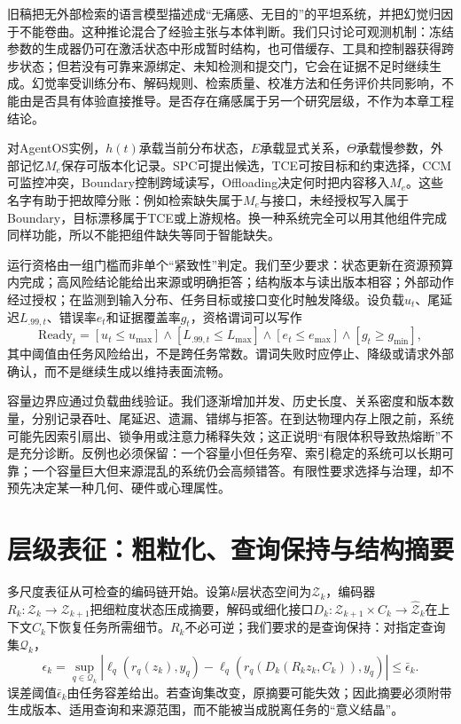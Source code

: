 旧稿把无外部检索的语言模型描述成“无痛感、无目的”的平坦系统，并把幻觉归因于不能卷曲。这种推论混合了经验主张与本体判断。我们只讨论可观测机制：冻结参数的生成器仍可在激活状态中形成暂时结构，也可借缓存、工具和控制器获得跨步状态；但若没有可靠来源绑定、未知检测和提交门，它会在证据不足时继续生成。幻觉率受训练分布、解码规则、检索质量、校准方法和任务评价共同影响，不能由是否具有体验直接推导。是否存在痛感属于另一个研究层级，不作为本章工程结论。

对AgentOS实例，$h(t)$承载当前分布状态，$E$承载显式关系，$\Theta$承载慢参数，外部记忆$M_e$保存可版本化记录。SPC可提出候选，TCE可按目标和约束选择，CCM可监控冲突，Boundary控制跨域读写，Offloading决定何时把内容移入$M_e$。这些名字有助于把故障分账：例如检索缺失属于$M_e$与接口，未经授权写入属于Boundary，目标漂移属于TCE或上游规格。换一种系统完全可以用其他组件完成同样功能，所以不能把组件缺失等同于智能缺失。

运行资格由一组门槛而非单个“紧致性”判定。我们至少要求：状态更新在资源预算内完成；高风险结论能给出来源或明确拒答；结构版本与读出版本相容；外部动作经过授权；在监测到输入分布、任务目标或接口变化时触发降级。设负载$u_t$、尾延迟$L_{.99,t}$、错误率$e_t$和证据覆盖率$g_t$，资格谓词可以写作
\begin{equation}
 \mathrm{Ready}_t=[u_t\le u_{\max}]\wedge[L_{.99,t}\le L_{\max}]\wedge[e_t\le e_{\max}]\wedge[g_t\ge g_{\min}],
\end{equation}
其中阈值由任务风险给出，不是跨任务常数。谓词失败时应停止、降级或请求外部确认，而不是继续生成以维持表面流畅。

容量边界应通过负载曲线验证。我们逐渐增加并发、历史长度、关系密度和版本数量，分别记录吞吐、尾延迟、遗漏、错绑与拒答。在到达物理内存上限之前，系统可能先因索引扇出、锁争用或注意力稀释失效；这正说明“有限体积导致热熔断”不是充分诊断。反例也必须保留：一个容量小但任务窄、索引稳定的系统可以长期可靠；一个容量巨大但来源混乱的系统仍会高频错答。有限性要求选择与治理，却不预先决定某一种几何、硬件或心理属性。

\section{层级表征：粗粒化、查询保持与结构摘要}
\label{sec:geometric_mold_renormalization}

多尺度表征从可检查的编码链开始。设第$k$层状态空间为$\mathcal Z_k$，编码器$R_k:\mathcal Z_k\to\mathcal Z_{k+1}$把细粒度状态压成摘要，解码或细化接口$D_k:\mathcal Z_{k+1}\times C_k\to\widehat{\mathcal Z}_k$在上下文$C_k$下恢复任务所需细节。$R_k$不必可逆；我们要求的是查询保持：对指定查询集$\mathcal Q_k$，
\begin{equation}
 \epsilon_k=\sup_{q\in\mathcal Q_k}\left|\ell_q(r_q(z_k),y_q)-\ell_q(r_q(D_k(R_kz_k,C_k)),y_q)\right|\le\bar\epsilon_k.
\end{equation}
误差阈值$\bar\epsilon_k$由任务容差给出。若查询集改变，原摘要可能失效；因此摘要必须附带生成版本、适用查询和来源范围，而不能被当成脱离任务的“意义结晶”。

